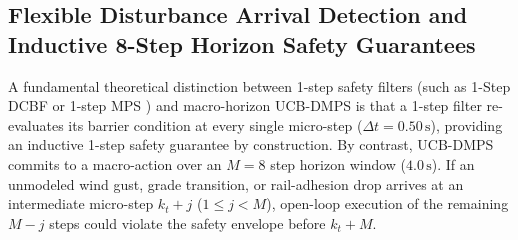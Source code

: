 \documentclass[10pt,a4paper]{article}
\begin{document}
\subsection{Flexible Disturbance Arrival Detection and Inductive 8-Step Horizon Safety Guarantees}
A fundamental theoretical distinction between 1-step safety filters (such as 1-Step DCBF \cite{ref6} or 1-step MPS \cite{ref3}) and macro-horizon UCB-DMPS is that a 1-step filter re-evaluates its barrier condition at every single micro-step ($\Delta t = 0.50\,\text{s}$), providing an inductive 1-step safety guarantee by construction. By contrast, UCB-DMPS commits to a macro-action over an $M = 8$ step horizon window ($4.0\,\text{s}$). If an unmodeled wind gust, grade transition, or rail-adhesion drop arrives at an intermediate micro-step $k_t + j$ ($1 \le j < M$), open-loop execution of the remaining $M - j$ steps could violate the safety envelope before $k_t + M$.
\end{document}
